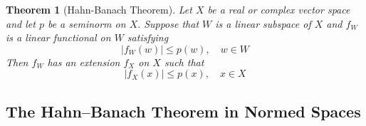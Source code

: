 \documentclass[10pt]{paper}
\newtheorem{theorem}{Theorem}[section]
\begin{document}
\begin{theorem}[Hahn-Banach Theorem]
    Let $X$ be a real or complex vector space and let $p$ be a seminorm on $X .$ Suppose that $W$ is a linear subspace of $X$ and $f_{W}$ is a linear functional on $W$ satisfying
    $$
        \left|f_{W}(w)\right| \leq p(w), \quad w \in W
    $$
    Then $f_{W}$ has an extension $f_{X}$ on $X$ such that
    $$
        \left|f_{X}(x)\right| \leq p(x), \quad x \in X
    $$
\end{theorem}


\subsection{The Hahn–Banach Theorem in Normed Spaces}
\end{document}
